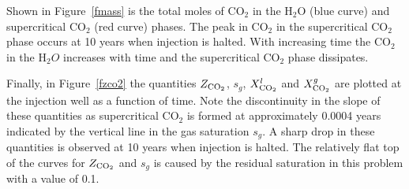 \documentclass[12pt]{article}
\renewcommand{\c}{{\rm CO_2}}
\begin{document}
Shown in Figure~\ref{fmass} is the total moles of CO$_2$ in the H$_2$O (blue curve) and supercritical CO$_2$ (red curve) phases. The peak in CO$_2$ in the supercritical CO$_2$ phase occurs at 10 years when injection is halted. With increasing time the CO$_2$ in the H$_2O$ increases with time and the supercritical CO$_2$ phase dissipates.

Finally, in Figure~\ref{fzco2} the quantities $Z_\c$, $s_g$, $X_\c^l$ and $X_\c^g$ are plotted at the injection well as a function of time. Note the discontinuity in the slope of these quantities as supercritical CO$_2$ is formed at approximately 0.0004 years indicated by the vertical line in the gas saturation $s_g$. A sharp drop in these quantities is observed at 10 years when injection is halted. The relatively flat top of the curves for $Z_\c$ and $s_g$ is caused by the residual saturation in this problem with a value of 0.1.
\end{document}

